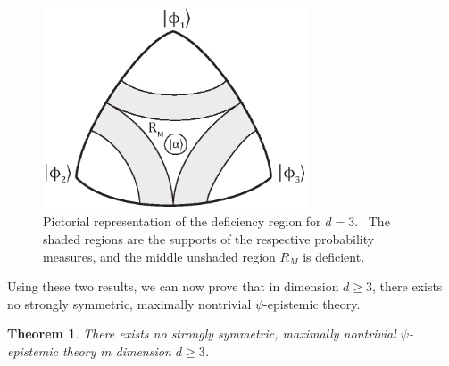\documentclass[letterpaper,11pt]{article}
\newtheorem{thm}{Theorem}
\begin{document}
\begin{figure}[h]
\centering \includegraphics[height=6cm]{figdeficiency2.eps} \vspace{-20pt}
\caption{Pictorial representation of the deficiency region for $d=3$. \ The
shaded regions are the supports of the respective probability measures,
and the middle unshaded region $R_M$ is deficient.} \label{figdeficiency}
\end{figure}

Using these two results, we can now prove that in dimension $d\geq 3$, there exists no strongly symmetric, maximally nontrivial $\psi$-epistemic theory.


\begin{thm}
\label{strong-symmetry-thm}
There exists no strongly symmetric, maximally nontrivial $\psi$-epistemic theory in
dimension $d\geq 3$.
\end{thm}
\end{document}
